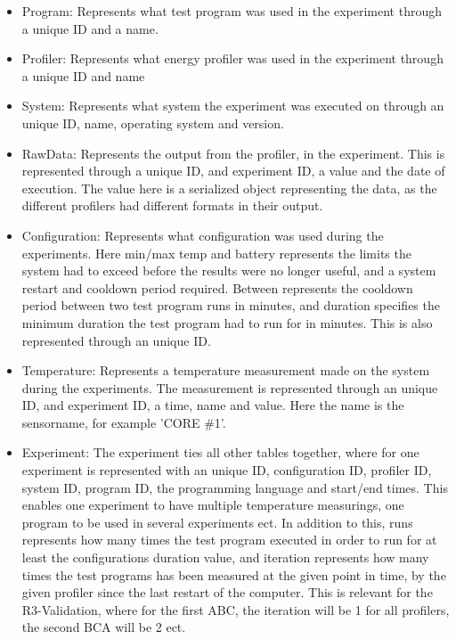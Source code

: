 \begin{itemize}
    \item Program: Represents what test program was used in the experiment through a unique ID and a name.
    \item Profiler: Represents what energy profiler was used in the experiment through a unique ID and name
    \item System: Represents what system the experiment was executed on through an unique ID, name, operating system and version. 
    \item RawData: Represents the output from the profiler, in the experiment. This is represented through a unique ID, and experiment ID, a value and the date of execution. The value here is a serialized object representing the data, as the different profilers had different formats in their output.
    \item Configuration: Represents what configuration was used during the experiments. Here min/max temp and battery represents the limits the system had to exceed before the results were no longer useful, and a system restart and cooldown period required. Between represents the cooldown period between two test program runs in minutes, and duration specifies the minimum duration the test program had to run for in minutes. This is also represented through an unique ID.
    \item Temperature: Represents a temperature measurement made on the system during the experiments. The measurement is represented through an unique ID, and experiment ID, a time, name and value. Here the name is the sensorname, for example 'CORE \#1'.
    \item Experiment: The experiment ties all other tables together, where for one experiment is represented with an unique ID, configuration ID, profiler ID, system ID, program ID, the programming language and start/end times. This enables one experiment to have multiple temperature measurings, one program to be used in several experiments ect. In addition to this, runs represents how many times the test program executed in order to run for at least the configurations duration value, and iteration represents how many times the test programs has been measured at the given point in time, by the given profiler since the last restart of the computer. This is relevant for the R3-Validation, where for the first ABC, the iteration will be 1 for all profilers, the second BCA will be 2 ect.
\end{itemize}

